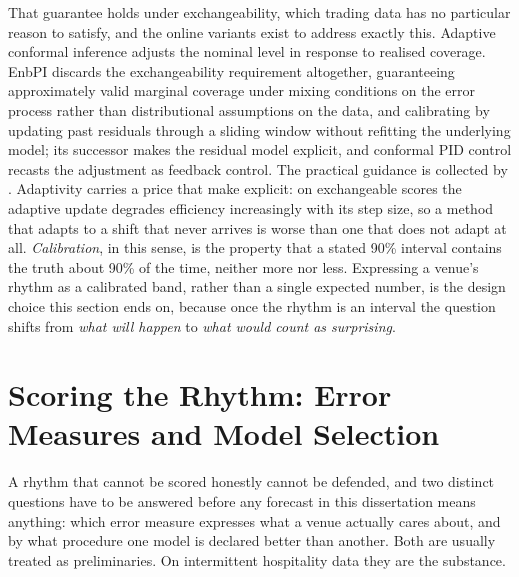 That guarantee holds under exchangeability, which trading data has no
particular reason to satisfy, and the online variants exist to address exactly
this. Adaptive conformal inference \citep{gibbs_adaptive_2021} adjusts the
nominal level in response to realised coverage. EnbPI \citep{xu_conformal_2021}
discards the exchangeability requirement altogether, guaranteeing approximately
valid marginal coverage under mixing conditions on the error process rather
than distributional assumptions on the data, and calibrating by updating past
residuals through a sliding window without refitting the underlying model; its
successor \citep{xu_sequential_2023} makes the residual model explicit, and
conformal PID control \citep{angelopoulos_conformal_2023-1} recasts the
adjustment as feedback control. The practical guidance is collected by
\citet[a 2025 preprint]{stocker_gentle_2025}. Adaptivity carries a price that
\citet{zaffran_adaptive_2022} make explicit: on exchangeable scores the
adaptive update degrades efficiency increasingly with its step size, so a
method that adapts to a shift that never arrives is worse than one that does
not adapt at all. \emph{Calibration}, in this sense, is the property that a
stated 90\% interval contains the truth about 90\% of the time, neither more
nor less. Expressing a venue's rhythm as a calibrated band, rather than a
single expected number, is the design choice this section ends on, because once
the rhythm is an interval the question shifts from \emph{what will happen} to
\emph{what would count as surprising}.

\section{Scoring the Rhythm: Error Measures and Model Selection}
\label{sec:rw-ruler}

A rhythm that cannot be scored honestly cannot be defended, and two distinct
questions have to be answered before any forecast in this dissertation means
anything: which error measure expresses what a venue actually cares about, and
by what procedure one model is declared better than another. Both are usually
treated as preliminaries. On intermittent hospitality data they are the
substance.


